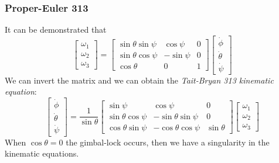 \subsubsection{Proper-Euler 313}
It can be demonstrated that
\begin{equation}
        \begin{bmatrix}
            \omega_1\\
            \omega_2\\
            \omega_3
        \end{bmatrix} = 
        \begin{bmatrix}
           \sin\theta\sin\psi&\cos\psi&0\\
           \sin\theta\cos\psi&-\sin\psi&0\\
           \cos\theta&0&1
        \end{bmatrix}
        \begin{bmatrix}
            \dot{\phi}\\
            \dot{\theta}\\
            \dot{\psi}
        \end{bmatrix}
\end{equation}
We can invert the matrix and we can obtain the \textit{Tait-Bryan 313 kinematic equation}:
\begin{equation}
    \begin{bmatrix}
        \dot{\phi}\\
        \dot{\theta}\\
        \dot{\psi}
    \end{bmatrix}=\frac{1}{\sin\theta}\begin{bmatrix}
        \sin\psi&\cos\psi&0\\
        \sin\theta\cos\psi&-\sin\theta\sin\psi&0\\
        \cos\theta\sin\psi&-\cos\theta\cos\psi&\sin\theta
    \end{bmatrix}\begin{bmatrix}
        \omega_1\\
        \omega_2\\
        \omega_3
    \end{bmatrix}
\end{equation}
When $\cos\theta=0$ the gimbal-lock occurs, then we have a singularity in the kinematic equations.

